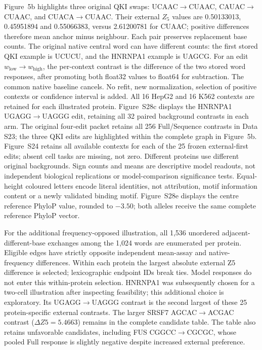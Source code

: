\documentclass[11pt]{article}
\begin{document}
Figure~5b highlights three original QKI swaps: UCAAC$\to$CUAAC,\allowbreak{} CAUAC$\to$CUAAC,\allowbreak{} and CUACA$\to$CUAAC. Their external $Z_5$ values are 0.50133013, 0.45951894 and 0.55066383, versus 2.61200781 for CUAAC; positive differences therefore mean anchor minus neighbour. Each pair preserves replacement base counts. The original native central word can have different counts: the first stored QKI example is UCUCU, and the HNRNPA1 example is UAGCG. For an edit \(w_\mathrm{low}\to w_\mathrm{high}\), the per-context contrast is the difference of the two stored word responses, after promoting both float32 values to float64 for subtraction. The common native baseline cancels. No refit, new normalization, selection of positive contexts or confidence interval is added. All 16 HepG2 and 16 K562 contexts are retained for each illustrated protein. Figure~S28c displays the HNRNPA1 UGAGG$\to$UAGGG edit, retaining all 32 paired background contrasts in each arm. The original four-edit packet retains all 256 Full/Sequence contrasts in Data S23; the three QKI edits are highlighted within the complete graph in Figure~5b. Figure~S24 retains all available contexts for each of the 25 frozen external-first edits; absent cell tasks are missing, not zero. Different proteins use different original backgrounds. Sign counts and means are descriptive model readouts, not independent biological replications or model-comparison significance tests. Equal-height coloured letters encode literal identities, not attribution, motif information content or a newly validated binding motif. Figure~S28e displays the centre reference PhyloP value, rounded to $-3.50$; both alleles receive the same complete reference PhyloP vector.

For the additional frequency-opposed illustration, all 1,536 unordered adjacent-different-base exchanges among the 1,024 words are enumerated per protein. Eligible edges have strictly opposite independent mean-assay and native-frequency differences. Within each protein the largest absolute external Z5 difference is selected; lexicographic endpoint IDs break ties. Model responses do not enter this within-protein selection. HNRNPA1 was subsequently chosen for a two-cell illustration after inspecting feasibility; this additional choice is exploratory. Its UGAGG\(\to\)UAGGG contrast is the second largest of these 25 protein-specific external contrasts. The larger SRSF7 AGCAC\(\to\)ACGAC contrast (\(\Delta Z5=5.4663\)) remains in the complete candidate table. The table also retains unfavorable candidates, including FUS CGGCC\(\to\)CGCGC, whose pooled Full response is slightly negative despite increased external preference.
\end{document}
